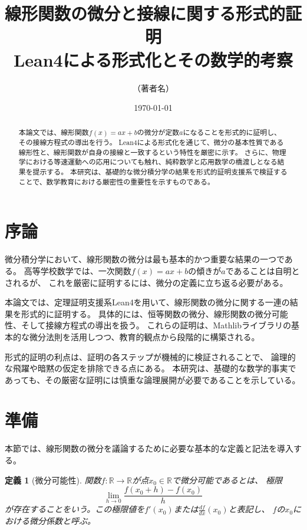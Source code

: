 \documentclass[a4paper,11pt]{jlreq}
\title{線形関数の微分と接線に関する形式的証明\\
\large Lean4による形式化とその数学的考察}
\author{（著者名）}
\date{\today}
\newtheorem{definition}[theorem]{定義}
\begin{document}
\maketitle

\begin{abstract}
本論文では、線形関数$f(x) = ax + b$の微分が定数$a$になることを形式的に証明し、その接線方程式の導出を行う。
Lean4による形式化を通じて、微分の基本性質である線形性と、線形関数が自身の接線と一致するという特性を厳密に示す。
さらに、物理学における等速運動への応用についても触れ、純粋数学と応用数学の橋渡しとなる結果を提示する。
本研究は、基礎的な微分積分学の結果を形式的証明支援系で検証することで、数学教育における厳密性の重要性を示すものである。
\end{abstract}

\section{序論}

微分積分学において、線形関数の微分は最も基本的かつ重要な結果の一つである。
高等学校数学では、一次関数$f(x) = ax + b$の傾きが$a$であることは自明とされるが、
これを厳密に証明するには、微分の定義に立ち返る必要がある。

本論文では、定理証明支援系Lean4を用いて、線形関数の微分に関する一連の結果を形式的に証明する。
具体的には、恒等関数の微分、線形関数の微分可能性、そして接線方程式の導出を扱う。
これらの証明は、Mathlibライブラリの基本的な微分法則を活用しつつ、教育的観点から段階的に構築される。

形式的証明の利点は、証明の各ステップが機械的に検証されることで、
論理的な飛躍や暗黙の仮定を排除できる点にある。
本研究は、基礎的な数学的事実であっても、その厳密な証明には慎重な論理展開が必要であることを示している。

\section{準備}

本節では、線形関数の微分を議論するために必要な基本的な定義と記法を導入する。

\begin{definition}[微分可能性]
関数$f: \mathbb{R} \to \mathbb{R}$が点$x_0 \in \mathbb{R}$で微分可能であるとは、
極限
\[
\lim_{h \to 0} \frac{f(x_0 + h) - f(x_0)}{h}
\]
が存在することをいう。この極限値を$f'(x_0)$または$\frac{df}{dx}(x_0)$と表記し、
$f$の$x_0$における微分係数と呼ぶ。
\end{definition}
\end{document}
